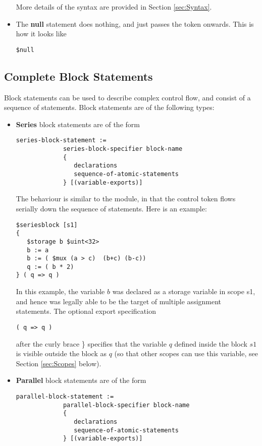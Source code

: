 \documentclass{article}
\begin{document}
\begin{itemize}
More details of the syntax are provided in 
Section \ref{sec:Syntax}.

\item The {\bf null} statement does nothing, and just passes the
token onwards.  This is how it looks like
\begin{verbatim}
$null
\end{verbatim}
\end{itemize}

\subsection{Complete Block Statements}

Block statements can be used to describe complex
control flow,  and consist of a sequence of statements.
Block statements are of
the following types:
\begin{itemize}
\item {\bf Series} block statements are of the form
\begin{verbatim}
series-block-statement :=
             series-block-specifier block-name
             { 
                declarations
                sequence-of-atomic-statements
             } [(variable-exports)]
\end{verbatim}
The behaviour is similar to the module, in that the control
token flows serially down the sequence of statements.
Here is an example:
\begin{verbatim}
$seriesblock [s1] 
{
   $storage b $uint<32>
   b := a
   b := ( $mux (a > c)  (b+c) (b-c))
   q := ( b * 2)
} ( q => q )
\end{verbatim}
In this example, the variable $b$ was declared as
a storage variable in scope s1, and hence was legally
able to be the target of multiple assignment statements.
The optional export specification
\begin{verbatim}
( q => q )
\end{verbatim}
after the curly brace \} specifies that the variable
$q$ defined inside the block $s1$ is visible outside
the block as $q$ (so that other scopes can use this
variable, see Section \ref{sec:Scopes} below).
\item {\bf Parallel} block statements are of the form
\begin{verbatim}
parallel-block-statement :=
             parallel-block-specifier block-name
             { 
                declarations
                sequence-of-atomic-statements
             } [(variable-exports)]
\end{verbatim}

\end{itemize}
\end{document}
